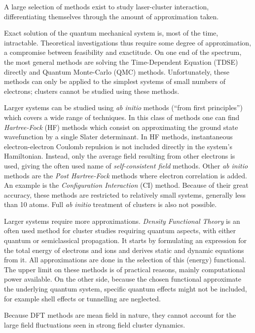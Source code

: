 A large selection of methods exist to study laser-cluster interaction,
differentiating themselves through the amount of approximation taken.

Exact solution of the quantum mechanical system is, most of the time,
intractable. Theoretical investigations thus require some degree of
approximation, a compromise between feasibility and exactitude. On one end of
the spectrum, the most general methods are solving the
Time-Dependent \schrodinger Equation (TDSE) directly and Quantum Monte-Carlo
(QMC) methods\cite{Nightingale1998}. Unfortunately, these methods can only be applied to the simplest
systems of small numbers of electrons; clusters cannot be studied using these
methods.

Larger systems can be studied using \textit{ab initio} methods (``from
first principles'') which covers a wide range of techniques. In this class of
methods one can find \textit{Hartree-Fock} (HF) methods which consist on
approximating the ground state wavefunction by a single Slater
determinant\cite{Laaksonen1986,Schafer2009}.
In HF methods, instantaneous electron-electron Coulomb repulsion is not
included directly in the system's Hamiltonian. Instead, only the average field
resulting from other electrons is used, giving the often used name of
\textit{self-consistent field} methods. Other \textit{ab
initio} methods are the \textit{Post Hartree-Fock} methods where electron
correlation is added\cite{Cramer2004}. An example is the \textit{Configuration Interaction} (CI)
method. Because of their great accuracy, these methods are restricted to
relatively small systems, generally less than 10 atoms. Full \textit{ab initio}
treatment of clusters is also not possible.

Larger systems require
more approximations. \textit{Density Functional Theory}
is an often used method for cluster studies requiring quantum aspects, with
either quantum or semiclassical propagation\cite{Schafer2009,Fennel2010}.
It starts by formulating an
expression for the total energy of electrons and ions and derives static and
dynamic equations from it. All approximations are done in the selection of this
(energy) functional. The upper limit on these methods is of practical reasons,
mainly computational power available. On the other side, because the chosen
functional approximate the underlying quantum system, specific quantum effects
might not be included, for example shell effects or tunnelling are neglected.

Because DFT methods are mean field in nature, they cannot account for the large
field fluctuations seen in strong field cluster dynamics.


